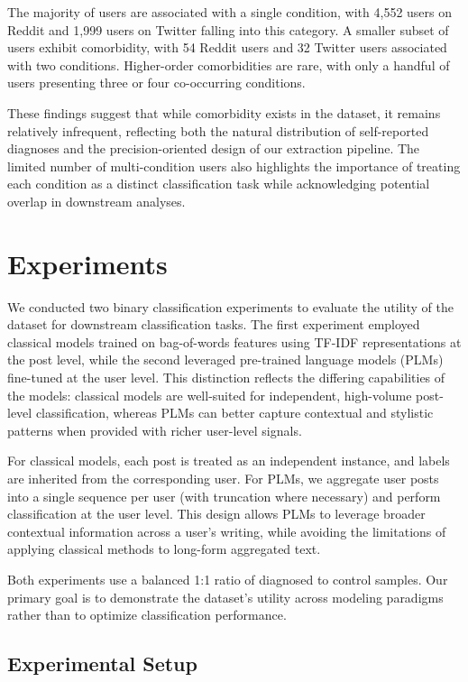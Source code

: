 \documentclass[11pt]{article}
\begin{document}
The majority of users are associated with a single condition, with 4,552 users on Reddit and 1,999 users on Twitter falling into this category. A smaller subset of users exhibit comorbidity, with 54 Reddit users and 32 Twitter users associated with two conditions. Higher-order comorbidities are rare, with only a handful of users presenting three or four co-occurring conditions.

These findings suggest that while comorbidity exists in the dataset, it remains relatively infrequent, reflecting both the natural distribution of self-reported diagnoses and the precision-oriented design of our extraction pipeline. The limited number of multi-condition users also highlights the importance of treating each condition as a distinct classification task while acknowledging potential overlap in downstream analyses.
\section{Experiments}
\label{sec:experiments}

We conducted two binary classification experiments to evaluate the utility of the dataset for downstream classification tasks. The first experiment employed classical models trained on bag-of-words features using TF-IDF representations at the post level, while the second leveraged pre-trained language models (PLMs) fine-tuned at the user level. This distinction reflects the differing capabilities of the models: classical models are well-suited for independent, high-volume post-level classification, whereas PLMs can better capture contextual and stylistic patterns when provided with richer user-level signals.

For classical models, each post is treated as an independent instance, and labels are inherited from the corresponding user. For PLMs, we aggregate user posts into a single sequence per user (with truncation where necessary) and perform classification at the user level. This design allows PLMs to leverage broader contextual information across a user’s writing, while avoiding the limitations of applying classical methods to long-form aggregated text.

Both experiments use a balanced 1:1 ratio of diagnosed to control samples. Our primary goal is to demonstrate the dataset’s utility across modeling paradigms rather than to optimize classification performance.

\subsection{Experimental Setup}
\label{subsec:setup}
\end{document}
